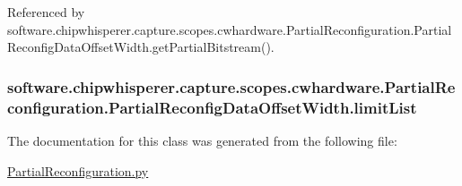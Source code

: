 Referenced by software.\+chipwhisperer.\+capture.\+scopes.\+cwhardware.\+Partial\+Reconfiguration.\+Partial\+Reconfig\+Data\+Offset\+Width.\+get\+Partial\+Bitstream().

\hypertarget{classsoftware_1_1chipwhisperer_1_1capture_1_1scopes_1_1cwhardware_1_1PartialReconfiguration_1_1PartialReconfigDataOffsetWidth_a00ed8e5b711a259aa28111e34f6da3f7}{}
\subsubsection[{limit\+List}]{\setlength{\rightskip}{0pt plus 5cm}software.\+chipwhisperer.\+capture.\+scopes.\+cwhardware.\+Partial\+Reconfiguration.\+Partial\+Reconfig\+Data\+Offset\+Width.\+limit\+List}\label{classsoftware_1_1chipwhisperer_1_1capture_1_1scopes_1_1cwhardware_1_1PartialReconfiguration_1_1PartialReconfigDataOffsetWidth_a00ed8e5b711a259aa28111e34f6da3f7}


The documentation for this class was generated from the following file\+:\begin{DoxyCompactItemize}
\item 
\hyperlink{PartialReconfiguration_8py}{Partial\+Reconfiguration.\+py}\end{DoxyCompactItemize}
